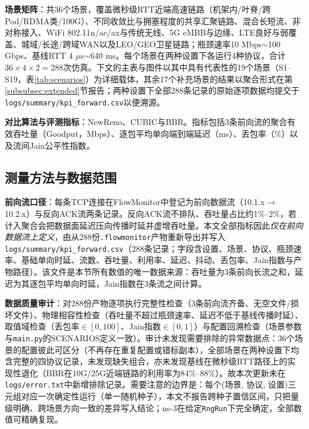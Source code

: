 \documentclass[10pt,twocolumn]{article}
\begin{document}
\textbf{场景矩阵}：共36个场景，覆盖微秒级RTT近端高速链路（机架内/叶脊/跨Pod/RDMA类/100G）、不同收敛比与拥塞程度的共享汇聚链路、混合长短流、非对称接入、WiFi 802.11n/ac/ax与传统无线、5G eMBB与边缘、LTE良好与弱覆盖、城域/长途/跨域WAN以及LEO/GEO卫星链路；瓶颈速率10 Mbps$\sim$100 Gbps、基线RTT 4 $\mu$s$\sim$640 ms。每个场景在两种设置下各运行4种协议，合计$36\times4\times2=288$次仿真。下文的主表与图件以其中具有代表性的19个场景（S1--S19，表\ref{tab:scenarios}）为详细载体，其余17个补充场景的结果以聚合形式在第\ref{subsubsec:extended}节报告；两种设置下全部288条记录的原始逐项数据均提交于\texttt{logs/summary/kpi\_forward.csv}以便溯源。

\textbf{对比算法与评测指标}：NewReno\cite{newreno}、CUBIC\cite{cubic}与BBR\cite{bbr}。指标包括3条前向流的聚合有效吞吐量（Goodput，Mbps）、逐包平均单向端到端延迟（ms）、丢包率（\%）以及流间Jain公平性指数\cite{fairness}。

\subsection{测量方法与数据范围}
\label{subsec:data-audit}

\textbf{前向流口径}：每条TCP连接在FlowMonitor中登记为前向数据流（10.1.x$\rightarrow$10.2.x）与反向ACK流两条记录。反向ACK流不排队、吞吐量占比约1\%--2\%，若计入聚合会把数据面延迟压向传播时延并虚增吞吐量。本文全部指标因此\emph{仅在前向数据流上定义}，由从288份\texttt{.flowmonitor}产物重新导出并写入\texttt{logs/summary/kpi\_forward.csv}（288条记录；字段含设置、场景、协议、瓶颈速率、基础单向时延、流数、吞吐量、利用率、延迟、抖动、丢包率、Jain指数与产物路径）。该文件是本节所有数值的唯一数据来源：吞吐量为3条前向长流之和，延迟为其逐包平均单向时延，Jain指数在3条流之间计算。

\textbf{数据质量审计}：对288份产物逐项执行完整性检查（3条前向流齐备、无空文件/损坏文件）、物理相容性检查（吞吐量不超过瓶颈速率、延迟不低于基线传播时延）、取值域检查（丢包率$\in[0,100]$、Jain指数$\in[0,1]$）与配置回溯检查（场景参数与\texttt{main.py}的SCENARIOS定义一致）。审计未发现需要排除的异常数据点：36个场景的配置彼此可区分（不再存在重复配置或错标副本），全部场景在两种设置下均含完整的四协议记录，未发现缺失组合，亦未发现基线在微秒级RTT路径上的实现性退化（BBR在10G/25G近端链路的利用率为84\%--88\%）。故本次更新未在\texttt{logs/error.txt}中新增排除记录。需要注意的边界是：每个(场景, 协议, 设置)三元组对应一次确定性运行（单一随机种子），本文不报告跨种子置信区间，只把量级明确、跨场景方向一致的差异写入结论；ns-3在给定\texttt{RngRun}下完全确定，全部数值可精确复现。
\end{document}

